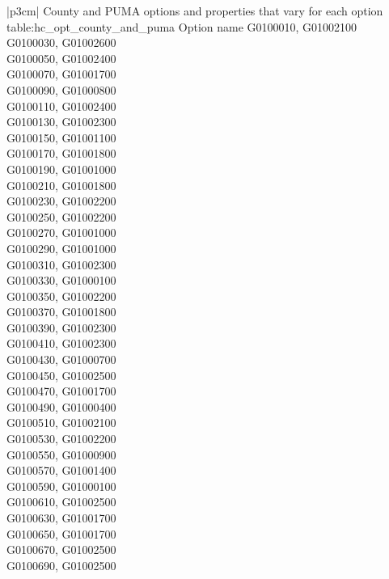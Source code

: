 \begin{customLongTable}{ |p{3cm}| }
{County and PUMA options and properties that vary for each option} {table:hc_opt_county_and_puma}
{Option name}
G0100010, G01002100 \\ \hline
G0100030, G01002600 \\ \hline
G0100050, G01002400 \\ \hline
G0100070, G01001700 \\ \hline
G0100090, G01000800 \\ \hline
G0100110, G01002400 \\ \hline
G0100130, G01002300 \\ \hline
G0100150, G01001100 \\ \hline
G0100170, G01001800 \\ \hline
G0100190, G01001000 \\ \hline
G0100210, G01001800 \\ \hline
G0100230, G01002200 \\ \hline
G0100250, G01002200 \\ \hline
G0100270, G01001000 \\ \hline
G0100290, G01001000 \\ \hline
G0100310, G01002300 \\ \hline
G0100330, G01000100 \\ \hline
G0100350, G01002200 \\ \hline
G0100370, G01001800 \\ \hline
G0100390, G01002300 \\ \hline
G0100410, G01002300 \\ \hline
G0100430, G01000700 \\ \hline
G0100450, G01002500 \\ \hline
G0100470, G01001700 \\ \hline
G0100490, G01000400 \\ \hline
G0100510, G01002100 \\ \hline
G0100530, G01002200 \\ \hline
G0100550, G01000900 \\ \hline
G0100570, G01001400 \\ \hline
G0100590, G01000100 \\ \hline
G0100610, G01002500 \\ \hline
G0100630, G01001700 \\ \hline
G0100650, G01001700 \\ \hline
G0100670, G01002500 \\ \hline
G0100690, G01002500 \\ \hline

\end{customLongTable}
